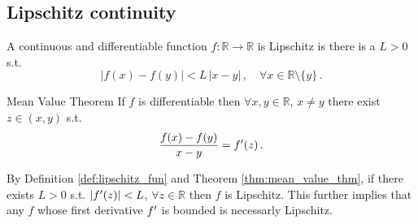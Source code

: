 \documentclass[../main.tex]{subfiles}
\begin{document}
\subsection{Lipschitz continuity}\label{subsec:lipschitz_cont}

\begin{definition}\label{def:lipschitz_fun}
        A continuous and differentiable function $f:\mathbb{R}\to \mathbb{R}$ is Lipschitz is there is a $L>0$ s.t.
        \begin{equation*}
                |f(x)-f(y)| < L\,|x-y|\,,\quad\forall x\in \mathbb{R}\setminus\{y\}\,.
        \end{equation*}
\end{definition}

\begin{theorem}[label=thm:mean_value_thm]{Mean Value Theorem}{}
        If $f$ is differentiable then $\forall x,y\in \mathbb{R}$, $x\neq y$ there exist $z\in(x,y)$ s.t.
        \begin{equation*}
                \frac{f(x)-f(y)}{x-y} = f'(z)\,.
        \end{equation*}
\end{theorem}

\begin{corollary}
     By Definition \ref{def:lipschitz_fun} and Theorem \ref{thm:mean_value_thm}, if there exists $L>0$ s.t. $|f'(z)|<L$, $\forall z \in \mathbb{R}$ then $f$ is Lipschitz. This further implies that any $f$ whose first derivative $f'$ is bounded is necessarly Lipschitz.
\end{corollary}


\end{document}
